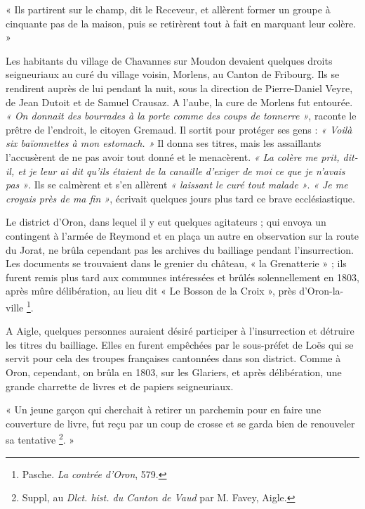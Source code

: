 \documentclass[french,twoside]{book} %
\newenvironment{quoteblock}%
  {\begin{quoting}}
  {\end{quoting}}
\newenvironment{quotebar}{%
    \def\FrameCommand{{\color{rubric!10!}\vrule width 0.5em} \hspace{0.9em}}%
    \def\OuterFrameSep{\itemsep} %
    \MakeFramed {\advance\hsize-\width \FrameRestore}
  }%
  {%
    \endMakeFramed
  }
\renewenvironment{quoteblock}%
  {%
    \savenotes
    \setstretch{0.9}
    \begin{quotebar}
  }
  {%
    \end{quotebar}
    \spewnotes
  }
\begin{document}
\begin{quoteblock}
\noindent « Ils partirent sur le champ, dit le Receveur, et allèrent former un groupe à cinquante pas de la maison, puis se retirèrent tout à fait en marquant leur colère. »\end{quoteblock}

\noindent Les habitants du village de Chavannes sur Moudon devaient quelques droits seigneuriaux au curé du village voisin, Morlens, au Canton de Fribourg. Ils se rendirent auprès de lui pendant la nuit, sous la direction de Pierre-Daniel Veyre, de Jean Dutoit et de Samuel Crausaz. A l’aube, la cure de Morlens fut entourée. \emph{« On donnait des bourrades à la porte comme des coups de tonnerre »}, raconte le prêtre de l’endroit, le citoyen Gremaud. Il sortit pour protéger ses gens : \emph{« Voilà six baïonnettes à mon estomach. »} Il donna ses titres, mais les assaillants l’accusèrent de ne pas avoir tout donné et le menacèrent. \emph{« La colère me prit\emph{, dit-il}, et je leur ai dit qu’ils étaient de la canaille d’exiger de moi ce que je n’avais pas »}. Ils se calmèrent et s’en allèrent \emph{« laissant le curé tout malade »}. \emph{« Je me croyais près de ma fin »}, écrivait quelques jours plus tard ce brave ecclésiastique.\par
Le district d’Oron, dans lequel il y eut quelques agitateurs ; qui envoya un contingent à l’armée de Reymond et en plaça un autre en observation sur la route du Jorat, ne brûla cependant pas les archives du bailliage pendant l’insurrection. Les documents se trouvaient dans le grenier du château, « la Grenatterie » ; ils furent remis plus tard aux communes intéressées et brûlés solennellement en 1803, après mûre délibération, au lieu dit « Le Bosson de la Croix », près d’Oron-la-ville \footnote{Pasche. \emph{La contrée d’Oron}, 579.}.\par
A Aigle, quelques personnes auraient désiré participer à l’insurrection et détruire les titres du bailliage. Elles en furent empêchées par le sous-préfet de Loës qui se servit pour cela des troupes françaises cantonnées dans son district. Comme à Oron, cependant, on brûla en 1803, sur les Glariers, et après délibération, une grande charrette de livres et de papiers seigneuriaux.\par

\begin{quoteblock}
 \noindent « Un jeune garçon qui cherchait à retirer un parchemin pour en faire une couverture de livre, fut reçu par un coup de crosse et se garda bien de renouveler sa tentative \footnote{Suppl, au \emph{Dlct. hist. du Canton de Vaud} par M. Favey, Aigle.}. »
 \end{quoteblock}
\end{document}
